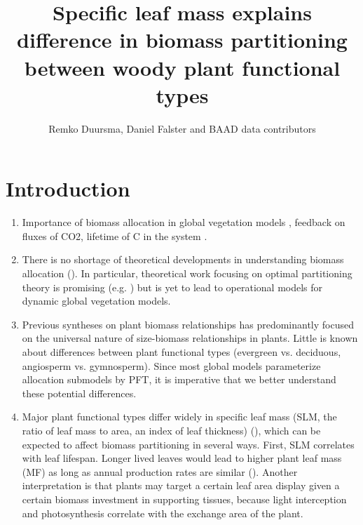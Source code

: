 \documentclass[a4paper]{article}
\begin{document}
\title{Specific leaf mass explains difference in biomass partitioning between woody plant functional types}

\author{Remko Duursma, Daniel Falster and BAAD data contributors}

\maketitle



\section{Introduction}

\begin{enumerate}
\item Importance of biomass allocation in global vegetation models \cite{ise_comparison_2010}, feedback on fluxes of CO2, lifetime of C in the system \cite{friend_carbon_2014}.
  
\item There is no shortage of theoretical developments in understanding biomass allocation (\cite{cannell_carbon_1994,franklin_modeling_2012,enquist_land_2012}). In particular, theoretical work focusing on optimal partitioning theory is promising (e.g. \cite{valentine_modeling_2012}) but is yet to lead to operational models for dynamic global vegetation models.

\item Previous syntheses on plant biomass relationships has predominantly focused on the universal nature of size-biomass relationships in plants. Little is known about differences between plant functional types (evergreen vs. deciduous, angiosperm vs. gymnosperm). Since most global models parameterize allocation submodels by PFT, it is imperative that we better understand these potential differences.

\item Major plant functional types differ widely in specific leaf mass (SLM, the ratio of leaf mass to area, an index of leaf thickness) (\cite{poorter_causes_2009}), which can be expected to affect biomass partitioning in several ways. First, SLM correlates with leaf lifespan. Longer lived leaves would lead to higher plant leaf mass (MF) as long as annual production rates are similar (\cite{enquist_global_2002}). Another interpretation is that plants may target a certain leaf area display given a certain biomass investment in supporting tissues, because light interception and photosynthesis correlate with the exchange area of the plant. 


\end{enumerate}
\end{document}
